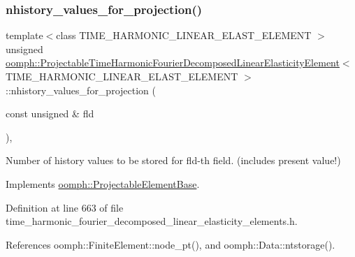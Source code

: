 \subsubsection{\texorpdfstring{nhistory\+\_\+values\+\_\+for\+\_\+projection()}{nhistory\_values\_for\_projection()}}
{\footnotesize\ttfamily template$<$class T\+I\+M\+E\+\_\+\+H\+A\+R\+M\+O\+N\+I\+C\+\_\+\+L\+I\+N\+E\+A\+R\+\_\+\+E\+L\+A\+S\+T\+\_\+\+E\+L\+E\+M\+E\+NT $>$ \\
unsigned \hyperlink{classoomph_1_1ProjectableTimeHarmonicFourierDecomposedLinearElasticityElement}{oomph\+::\+Projectable\+Time\+Harmonic\+Fourier\+Decomposed\+Linear\+Elasticity\+Element}$<$ T\+I\+M\+E\+\_\+\+H\+A\+R\+M\+O\+N\+I\+C\+\_\+\+L\+I\+N\+E\+A\+R\+\_\+\+E\+L\+A\+S\+T\+\_\+\+E\+L\+E\+M\+E\+NT $>$\+::nhistory\+\_\+values\+\_\+for\+\_\+projection (\begin{DoxyParamCaption}\item[{const unsigned \&}]{fld }\end{DoxyParamCaption})\hspace{0.3cm}{\ttfamily [inline]}, {\ttfamily [virtual]}}



Number of history values to be stored for fld-\/th field. (includes present value!) 



Implements \hyperlink{classoomph_1_1ProjectableElementBase_ac6790f394630b964663281f8740f43a5}{oomph\+::\+Projectable\+Element\+Base}.



Definition at line 663 of file time\+\_\+harmonic\+\_\+fourier\+\_\+decomposed\+\_\+linear\+\_\+elasticity\+\_\+elements.\+h.



References oomph\+::\+Finite\+Element\+::node\+\_\+pt(), and oomph\+::\+Data\+::ntstorage().

\mbox{\label{classoomph_1_1ProjectableTimeHarmonicFourierDecomposedLinearElasticityElement_a3fc2ba3dfb2547fcc704478280e9e096}} 
